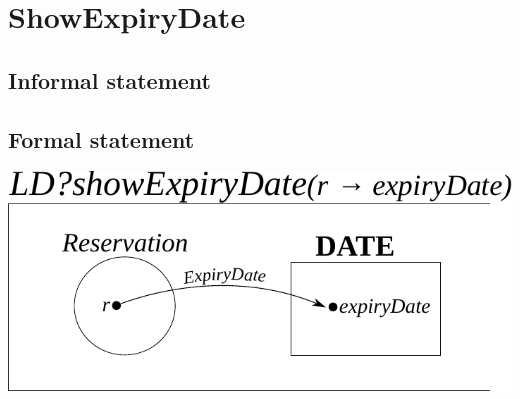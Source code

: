 \documentclass[]{article}
\begin{document}
\section{ShowExpiryDate}
\subsection{Informal statement}
\subsection{Formal statement}
\begin{center}
	\includegraphics[scale=0.75]{show_expiry_date.pdf}
\end{center}
\end{document}
